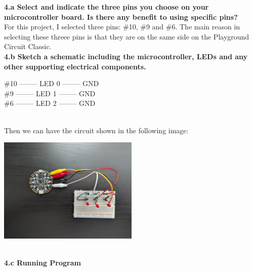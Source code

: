 \documentclass{article}
\begin{document}
\textbf{4.a Select and indicate the three pins you choose on your microcontroller board. Is there
any benefit to using specific pins?}\\[0.5em]
For this project, I selected three pins: \#10, \#9 and \#6. The main reason in selecting these threee pins is that they are on the same side on the Playground Circuit Classic. \\[0.5em]
\textbf{4.b Sketch a schematic including the microcontroller, LEDs and any other supporting
electrical components.}\\[0.5em]
\begin{minipage}{\textwidth}
    \centering
    \#10 -------- LED 0 -------- GND\\
    \#9 -------- LED 1 -------- GND\\
    \#6 -------- LED 2 -------- GND\\
\end{minipage}\\[0.5em]
Then we can have the circuit shown in the following image:\\
\begin{minipage}{\textwidth}
    \centering
    \includegraphics[width = 0.5\textwidth]{circuit.jpg}
\end{minipage}\\[1em]
\textbf{4.c Running Program}
\end{document}
